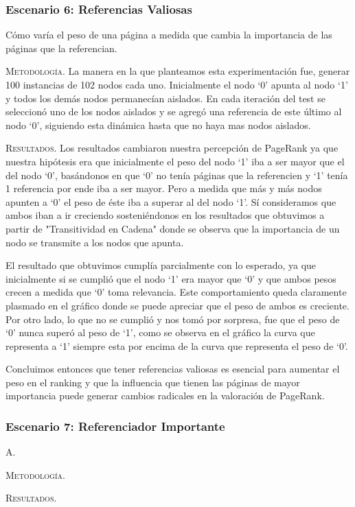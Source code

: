 \vspace{2em}
\subsubsection{Escenario 6: Referencias Valiosas} Cómo varía el peso de una página a medida que cambia la importancia de las páginas que la referencian.

\vspace{1em}
\noindent \textsc{Metodología}. La manera en la que planteamos esta experimentación fue, generar 100 instancias de 102 nodos cada uno. Inicialmente el nodo `0' apunta al nodo `1' y todos los demás nodos permanecían aislados. En cada iteración del test se seleccionó uno de los nodos aislados y se agregó una referencia de este último al nodo `0', siguiendo esta dinámica hasta que no haya mas nodos aislados.

\vspace{1em}
\noindent \textsc{Resultados}. Los resultados cambiaron nuestra percepción de PageRank ya que nuestra hipótesis era que inicialmente el peso del nodo `1' iba a ser mayor que el del nodo `0', basándonos en que `0' no tenía páginas que la referencien y `1' tenía 1 referencia por ende iba a ser mayor. Pero a medida que más y más nodos apunten a `0' el peso de éste iba a superar al del nodo `1'. Sí consideramos que ambos iban a ir creciendo sosteniéndonos en los resultados que obtuvimos a partir de "Transitividad en Cadena" donde se observa que la importancia de un nodo se transmite a los nodos que apunta.

\vspace{1em}
El resultado que obtuvimos cumplía parcialmente con lo esperado, ya que inicialmente si se cumplió que el nodo `1' era mayor que `0' y que ambos pesos crecen a medida que `0' toma relevancia. Este comportamiento queda claramente plasmado en el gráfico donde se puede apreciar que el peso de ambos es creciente. 
Por otro lado, lo que no se cumplió y nos tomó por sorpresa, fue que el peso de `0' nunca superó al peso de `1', como se observa en el gráfico la curva que representa a `1' siempre esta por encima de la curva que representa el peso de `0'.

\vspace{1em}
Concluimos entonces que tener referencias valiosas es esencial para aumentar el peso en el ranking y que la influencia que tienen las páginas de mayor importancia puede generar cambios radicales en la valoración de PageRank.



\vspace{2em}
\subsubsection{Escenario 7: Referenciador Importante} A.

\vspace{1em}
\noindent \textsc{Metodología}.  

\vspace{1em}
\noindent \textsc{Resultados}.

